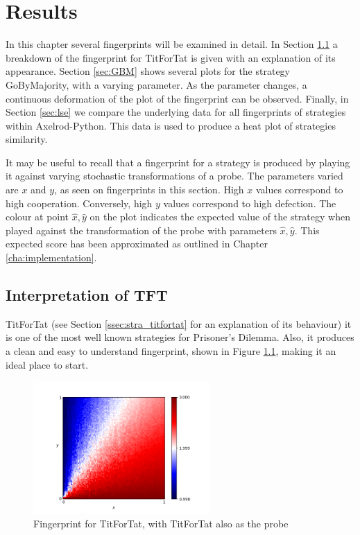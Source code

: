 
\chapter{Results}\label{cha:results}

In this chapter several fingerprints will be examined in detail.
In Section \ref{sec:tft} a breakdown of the fingerprint for TitForTat is given with an explanation of its appearance.
Section \ref{sec:GBM} shows several plots for the strategy GoByMajority, with a varying parameter.
As the parameter changes, a continuous deformation of the plot of the
fingerprint can be observed.
Finally, in Section \ref{sec:lse} we compare the underlying data for all fingerprints of strategies within Axelrod-Python.
This data is used to produce a heat plot of strategies similarity.

It may be useful to recall that a fingerprint for a strategy is produced by playing it against varying stochastic transformations of a probe.
The parameters varied are $x$ and $y$, as seen on fingerprints in this section.
High $x$ values correspond to high cooperation.
Conversely, high $y$ values correspond to high defection.
The colour at point $\hat{x}, \hat{y}$ on the plot indicates the expected value of the strategy when played against the transformation of the probe with parameters $\hat{x}, \hat{y}$.
This expected score has been approximated as outlined in Chapter \ref{cha:implementation}.



\section{Interpretation of TFT}\label{sec:tft}
TitForTat (see Section \ref{ssec:stra_titfortat} for an explanation of its behaviour) it is one of the most well known strategies for Prisoner's Dilemma.
Also, it produces a clean and easy to understand fingerprint, shown in Figure \ref{fig:TFT}, making it an ideal place to start.

\begin{figure}[hbtp!]
\centering
\includegraphics[width = 0.6\textwidth]{../img/Numerical/Tit_For_Tat.png}
\caption{Fingerprint for TitForTat, with TitForTat also as the probe}
\label{fig:TFT}
\end{figure}

